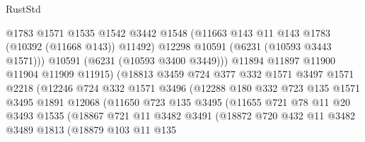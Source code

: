 \begin{lexlean}{RustStd}
\begin{coremodule}
{{                              @1783
                              @1571
                              @1535
                              @1542
                              @3442
                              @1548
                              (@11663 @143 @11 @143 @1783 (@10392 (@11668 @143)) @11492)
                              @12298
                              @10591
                              (@6231 (@10593 @3443 @1571)))
                            @10591
                            (@6231 (@10593 @3400 @3449)))
                          @11894
                          @11897
                          @11900
                          @11904
                          @11909
                          @11915)
                        (@18813
                          @3459
                          @724
                          @377
                          @332
                          @1571
                          @3497
                          @1571
                          @2218
                          (@12246
                            @724
                            @332
                            @1571
                            @3496
                            (@12288
                              @180
                              @332
                              @723
                              @135
                              @1571
                              @3495
                              @1891
                              @12068
                              (@11650
                                @723
                                @135
                                @3495
                                (@11655
                                  @721
                                  @78
                                  @11
                                  @20
                                  @3493
                                  @1535
                                  (@18867
                                    @721
                                    @11
                                    @3482
                                    @3491
                                    (@18872
                                      @720
                                      @432
                                      @11
                                      @3482
                                      @3489
                                      @1813
                                      (@18879
                                        @103
                                        @11
                                        @135
}}
\end{coremodule}
\end{lexlean}

